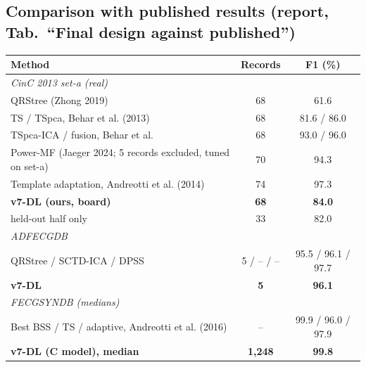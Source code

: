 \documentclass[11pt]{article}
\begin{document}
\subsection{Comparison with published results (report, Tab.\ ``Final design against published'')}
\begin{center}
\small
\begin{tabular}{lcc}
\toprule
\textbf{Method} & \textbf{Records} & \textbf{F1 (\%)} \\
\midrule
\multicolumn{3}{l}{\textit{CinC 2013 set-a (real)}} \\
QRStree (Zhong 2019) & 68 & 61.6 \\
TS / TSpca, Behar et al. (2013) & 68 & 81.6 / 86.0 \\
TSpca-ICA / fusion, Behar et al. & 68 & 93.0 / 96.0 \\
Power-MF (Jaeger 2024; 5 records excluded, tuned on set-a) & 70 & 94.3 \\
Template adaptation, Andreotti et al. (2014) & 74 & 97.3 \\
\textbf{v7-DL (ours, board)} & \textbf{68} & \textbf{84.0} \\
\quad held-out half only & 33 & 82.0 \\
\midrule
\multicolumn{3}{l}{\textit{ADFECGDB}} \\
QRStree / SCTD-ICA / DPSS & 5 / -- / -- & 95.5 / 96.1 / 97.7 \\
\textbf{v7-DL} & \textbf{5} & \textbf{96.1} \\
\midrule
\multicolumn{3}{l}{\textit{FECGSYNDB (medians)}} \\
Best BSS / TS / adaptive, Andreotti et al. (2016) & -- & 99.9 / 96.0 / 97.9 \\
\textbf{v7-DL (C model), median} & \textbf{1,248} & \textbf{99.8} \\
\bottomrule
\end{tabular}
\end{center}
\end{document}
